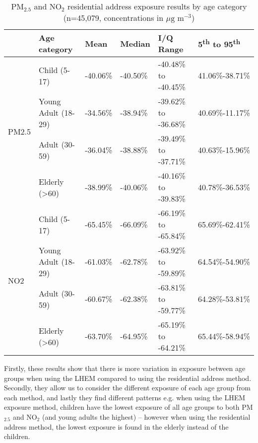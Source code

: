 \begin{table}[H]
\centering
\begin{tabular}{|l|l|l|l|l|l|}
\hline
                       & \bfseries{Age category}  & \bfseries{Mean}  & \bfseries{Median} & \bfseries{I/Q Range} & \bfseries{5\textsuperscript{th} to 95\textsuperscript{th}} \\ \hline
\multirow{4}{*}{PM2.5} & Child (5-17)             & -40.06\% & -40.50\% & -40.48\% to -40.45\%    & 41.06\%-38.71\% \\ \cline{2-5} 
                       & Young Adult (18-29)      & -34.56\% & -38.94\% & -39.62\% to -36.68\%    & 40.69\%-11.17\% \\ \cline{2-5} 
                       & Adult (30-59)            & -36.04\% & -38.88\% & -39.49\% to -37.71\%    & 40.63\%-15.96\% \\ \cline{2-5} 
                       & Elderly (\textgreater60) & -38.99\% & -40.06\% & -40.16\% to -39.83\%    & 40.78\%-36.53\% \\ \hline
\multirow{4}{*}{NO2}   & Child (5-17)             & -65.45\% & -66.09\% & -66.19\% to -65.84\%    & 65.69\%-62.41\% \\ \cline{2-5} 
                       & Young Adult (18-29)      & -61.03\% & -62.78\% & -63.92\% to -59.89\%    & 64.54\%-54.90\% \\ \cline{2-5} 
                       & Adult (30-59)            & -60.67\% & -62.38\% & -63.81\% to -59.77\%    & 64.28\%-53.81\% \\ \cline{2-5} 
                       & Elderly (\textgreater60) & -63.70\% & -64.95\% & -65.19\% to -64.21\%    & 65.44\%-58.94\% \\ \hline
\end{tabular}
\caption{PM$_{2.5}$ and NO$_{2}$ residential address exposure results by age category (n=45,079, concentrations in $\mu \text{g m}^{-3}$)}
\label{tab:percent_change_comparing_age_categories}
\end{table}

Firstly, these results show that there is more variation in exposure between age groups when using the LHEM compared to using the residential address method. Secondly, they allow us to consider the different exposure of each age group from each method, and lastly they find different patterns e.g. when using the LHEM exposure method, children have the lowest exposure of all age groups to both PM$_{2.5}$ and NO$_{2}$ (and young adults the highest) -- however when using the residential address method, the lowest exposure is found in the elderly instead of the children.

